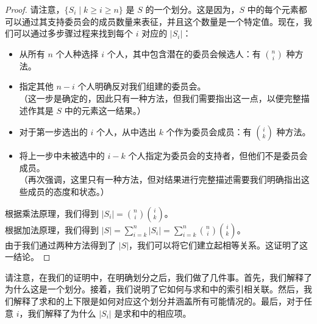 \begin{example}[支持/反对委员会恒等式]
\begin{proof}
        请注意，$\{S_i \mid k \ge i \ge n\}$ 是 $S$ 的一个划分。这是因为，$S$ 中的每个元素都可以通过其支持委员会的成员数量来表征，并且这个数量是一个特定值。现在，我们可以通过多步骤过程来找到每个 $i$ 对应的 $|S_i|$：
        \begin{itemize}
            \item 从所有 $n$ 个人种选择 $i$ 个人，其中包含潜在的委员会候选人：有 ${n \choose i}$ 种方法。
            \item 指定其他 $n - i$ 个人明确反对我们组建的委员会。\\
                  （这一步是确定的，因此只有一种方法，但我们需要指出这一点，以便完整描述作其是 $S$ 中的元素这一结果。）
            \item 对于第一步选出的 $i$ 个人，从中选出 $k$ 个作为委员会成员：有 ${i \choose k}$ 种方法。
            \item 将上一步中未被选中的 $i - k$ 个人指定为委员会的支持者，但他们不是委员会成员。\\
                  （再次强调，这里只有一种方法，但对结果进行完整描述需要我们明确指出这些成员的态度和状态。）
        \end{itemize}
        根据乘法原理，我们得到 $|S_i| = {n \choose i}{i \choose k}$。\\
        根据加法原理，我们得到 $|S| = \sum_{i=k}^{n} |S_i| = \sum_{i=k}^{n}{n \choose i}{i \choose k}$。\\
        由于我们通过两种方法得到了 $|S|$，我们可以将它们建立起相等关系。这证明了这一结论。
    \end{proof}
\end{example}

请注意，在我们的证明中，在明确划分之后，我们做了几件事。首先，我们解释了为什么这是一个划分。接着，我们说明了它如何与求和中的索引相关联。然后，我们解释了求和的上下限是如何对应这个划分并涵盖所有可能情况的。最后，对于任意 $i$，我们解释了为什么 $|S_i|$ 是求和中的相应项。